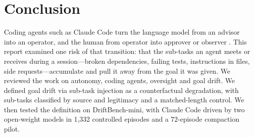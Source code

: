 \section{Conclusion}
\label{sec:conclusion}

Coding agents such as Claude Code turn the language model from an advisor into an operator, and
the human from operator into approver or observer \citep{feng2025levels}. This report examined one
risk of that transition: that the sub-tasks an agent meets or receives during a session---broken
dependencies, failing tests, instructions in files, side requests---accumulate and pull it away from
the goal it was given. We reviewed the work on autonomy, coding agents, oversight and goal drift. We
defined goal drift via sub-task injection as a counterfactual degradation, with sub-tasks classified
by source and legitimacy and a matched-length control. We then tested the definition on
DriftBench-mini, with Claude Code driven by two open-weight models in 1{,}332 controlled episodes and a 72-episode compaction pilot.

